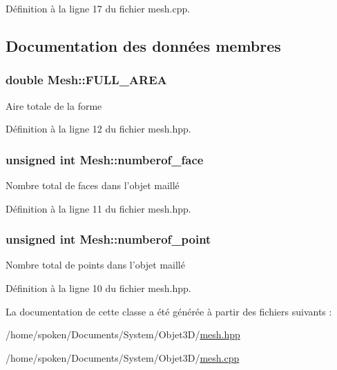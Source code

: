 Définition à la ligne 17 du fichier mesh.\-cpp.



\subsection{Documentation des données membres}
\hypertarget{class_mesh_a0e1f18abe6ea5a9943e6f8e672f8b037}{
\subsubsection[{F\-U\-L\-L\-\_\-\-A\-R\-E\-A}]{\setlength{\rightskip}{0pt plus 5cm}double Mesh\-::\-F\-U\-L\-L\-\_\-\-A\-R\-E\-A\hspace{0.3cm}{\ttfamily [private]}}}\label{class_mesh_a0e1f18abe6ea5a9943e6f8e672f8b037}
Aire totale de la forme 

Définition à la ligne 12 du fichier mesh.\-hpp.

\hypertarget{class_mesh_a8ad7f6788ff772d5e0e17e992571f364}{
\subsubsection[{numberof\-\_\-face}]{\setlength{\rightskip}{0pt plus 5cm}unsigned int Mesh\-::numberof\-\_\-face\hspace{0.3cm}{\ttfamily [private]}}}\label{class_mesh_a8ad7f6788ff772d5e0e17e992571f364}
Nombre total de faces dans l'objet maillé 

Définition à la ligne 11 du fichier mesh.\-hpp.

\hypertarget{class_mesh_a9c058bf3f414b6119d7e6ea09703057d}{
\subsubsection[{numberof\-\_\-point}]{\setlength{\rightskip}{0pt plus 5cm}unsigned int Mesh\-::numberof\-\_\-point\hspace{0.3cm}{\ttfamily [private]}}}\label{class_mesh_a9c058bf3f414b6119d7e6ea09703057d}
Nombre total de points dans l'objet maillé 

Définition à la ligne 10 du fichier mesh.\-hpp.



La documentation de cette classe a été générée à partir des fichiers suivants \-:\begin{DoxyCompactItemize}
\item 
/home/spoken/\-Documents/\-System/\-Objet3\-D/\hyperlink{mesh_8hpp}{mesh.\-hpp}\item 
/home/spoken/\-Documents/\-System/\-Objet3\-D/\hyperlink{mesh_8cpp}{mesh.\-cpp}\end{DoxyCompactItemize}
